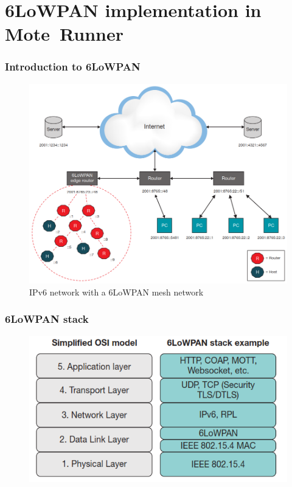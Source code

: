 \section{6LoWPAN implementation in \mbox{Mote Runner}}
\begin{frame}[fragile]
  \frametitle{Introduction to 6LoWPAN}
  \begin{figure}
    \includegraphics[width=.9\textwidth]{img/6low_network.png}
    \caption{IPv6 network with a 6LoWPAN mesh network}
  \end{figure}
\end{frame}

\begin{frame}[fragile]
  \frametitle{6LoWPAN stack}
  \begin{figure}
    \includegraphics[width=.9\textwidth]{img/6low_stack.png}
  \end{figure}
\end{frame}

